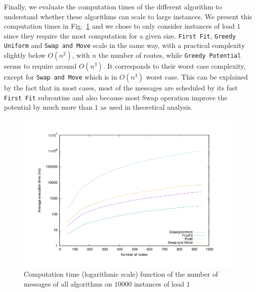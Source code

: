 \documentclass[a4paper,cleveref, autoref, thm-restate,UKenglish]{lipics-v2019}
\newcommand\firstfit{\texttt{First Fit}\xspace}
\newcommand\greedyuniform{\texttt{Greedy Uniform}\xspace}
\newcommand\swapandmove{\texttt{Swap and Move}\xspace}
\newcommand\greedypotential{\texttt{Greedy Potential}\xspace}
\begin{document}
 Finally, we evaluate the computation times of the different algorithm to understand whether these algorithms
 can scale to large instances. We present this computation times in Fig.~\ref{fig:timelog} and we chose to only consider
 instances of load $1$ since they require the most computation for a given size. \firstfit, \greedyuniform and \swapandmove
 scale in the same way, with a practical complexity slightly below $O(n^2)$, with $n$ the number of routes, while
 \greedypotential seems to require around $O(n^3)$. It corresponds to their worst case complexity, except for \swapandmove
 which is in $O(n^3)$ worst case. This can be explained by the fact that in most cases, most of the messages are scheduled by its fast \firstfit subroutine and also because most Swap operation improve the potential by much more than $1$ as used in theoretical analysis.

\begin{figure}
 \begin{center}
\includegraphics[scale=0.275]{log}
\end{center}
\caption{Computation time (logarithmic scale) function of the number of messages of all algorithms on $10000$ instances of load $1$}
\label{fig:timelog}
\end{figure}

 
\end{document}
